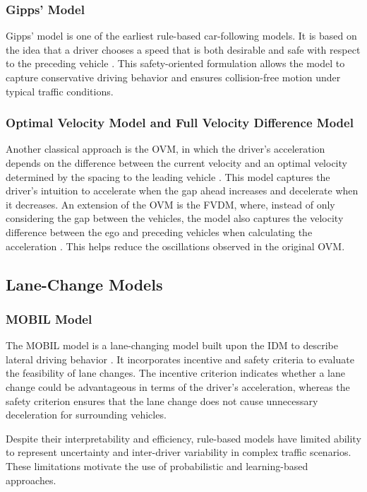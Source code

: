 \subsubsection{Gipps' Model}
Gipps' model is one of the earliest rule-based car-following models. 
It is based on the idea that a driver chooses a speed that is both desirable and safe with respect to the 
preceding vehicle \cite{GIPPS1981105}. This safety-oriented formulation
allows the model to capture conservative driving behavior and ensures collision-free motion under typical
traffic conditions.
\subsubsection{Optimal Velocity Model and Full Velocity Difference Model}
Another classical approach is the \ac{OVM}, in which the driver's acceleration depends on the difference 
between the current velocity and an optimal velocity determined by the spacing to the leading vehicle \cite{PhysRevE.51.1035}. This model captures
the driver's intuition to accelerate when the gap ahead increases and decelerate when it decreases. An extension of the \ac{OVM} is the \ac{FVDM}, 
where, instead of only considering the gap between the vehicles, the model also captures
the velocity difference between the ego and preceding vehicles when calculating the acceleration \cite{PhysRevE.64.017101}. This
helps reduce the oscillations observed in the original \ac{OVM}.

\subsection{Lane-Change Models}
\subsubsection{MOBIL Model}
The \ac{MOBIL} model is a lane-changing model built upon the \ac{IDM} to describe lateral driving behavior \cite{zhou2025,Kesting2007GeneralLM}. 
It incorporates incentive and safety criteria
to evaluate the feasibility of lane changes. The incentive criterion indicates whether a lane
change could be advantageous in terms of the driver's acceleration, whereas the safety criterion ensures
that the lane change does not cause unnecessary deceleration for surrounding vehicles.

\par Despite their interpretability and efficiency, rule-based models have limited ability to represent uncertainty and inter-driver variability in complex traffic scenarios. 
These limitations motivate the use of probabilistic and learning-based approaches.



